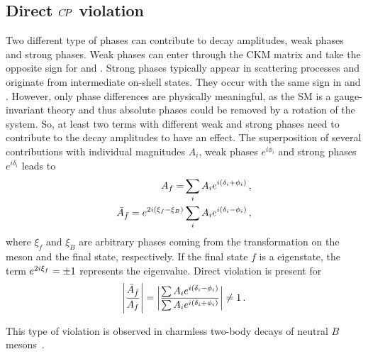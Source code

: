 
\subsection{Direct \texorpdfstring{${C\!P}$}{CP} violation}
\label{sec:cpviolation:types:direct}

Two different type of phases can contribute to decay amplitudes, weak phases
and strong phases. Weak phases can enter through the CKM matrix and take the
opposite sign for \Af and \Abarfbar. Strong phases typically appear in
scattering processes and originate from intermediate on-shell states. They
occur with the same sign in \Af and \Abarfbar. However, only phase differences
are physically meaningful, as the SM is a gauge-invariant theory and thus
absolute phases could be removed by a rotation of the system. So, at least two
terms with different weak and strong phases need to contribute to the decay
amplitudes to have an effect. The superposition of several contributions with
individual magnitudes $A_i$, weak phases $e^{i\phi_i}$ and strong phases
$e^{i\delta_i}$ leads to
\begin{align}
\begin{split}
	A_{f} = &\sum_i A_i e^{i(\delta_i+\phi_i)}\,,\\
	\bar{A}_{\bar{f}} = e^{2i(\xi_f-\xi_B)}&\sum_i A_i e^{i(\delta_i-\phi_i)}\,,
\end{split}
\end{align}
where $\xi_f$ and $\xi_B$ are arbitrary phases coming from the \CP
transformation on the \Bd meson and the final state, respectively. If the
final state $f$ is a \CP eigenstate, the term $e^{2i\xi_f} = \num{\pm1}$
represents the \CP eigenvalue. Direct \CP violation is present for
\begin{align}
	\left|\frac{\bar{A}_{\bar{f}}}{A_{f}}\right| = \left|\frac{\sum A_i e^{i(\delta_i-\phi_i)}}{\sum A_i e^{i(\delta_i+\phi_i)}}\right| \neq 1\,.
\end{align}

This type of \CP violation is observed in charmless two-body decays of neutral
$B$ mesons~\cite{Lees:2012mma,Duh:2012ie,LHCb-PAPER-2013-018}.